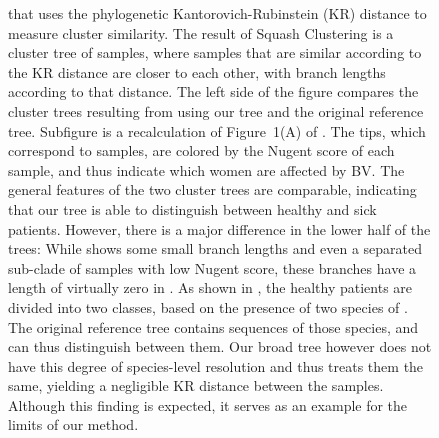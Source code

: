 \begin{figure}[hpbt]
{%
        that uses the phylogenetic Kantorovich-Rubinstein (KR) distance \citep{Evans2012} %
        to measure cluster similarity.
        The result of Squash Clustering is a cluster tree of samples,
        where samples that are similar according to the KR distance are closer to each other,
        with branch lengths according to that distance.
        The left side of the figure compares the cluster trees resulting from using
          our tree and
         the original reference tree.
        Subfigure  is a recalculation of Figure~1(A) of \citep{Srinivasan2012}.
        The tips, which correspond to samples, are colored by the Nugent score of each sample,
        and thus indicate which women are affected by \ac{BV}.
        The general features of the two cluster trees are comparable,
        indicating that our tree is able to distinguish between healthy and sick patients.
        However, there is a major difference in the lower half of the trees:
        While  shows some small branch lengths and even a separated sub-clade
        of samples with low Nugent score,
        these branches have a length of virtually zero in .
        As shown in \citep{Srinivasan2012}, the healthy patients are divided into two classes,
        based on the presence of two species of .
        The original reference tree contains sequences of those species, and can thus distinguish between them.
        Our broad  tree however
        does not have this degree of species-level resolution and thus treats them the same,
        yielding a negligible KR distance between the samples.
        Although this finding is expected, it serves as an example for the limits of our method.
}
\end{figure}
